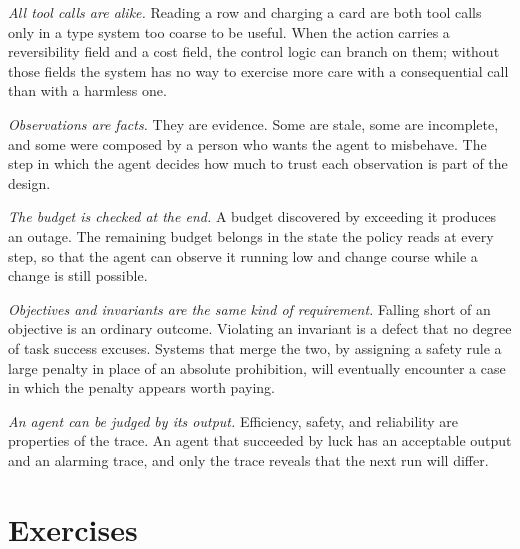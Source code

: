 \documentclass[11pt]{book}
\begin{document}
\textit{All tool calls are alike.} Reading a row and charging a card are both tool calls only in a type system too coarse to be useful. When the action carries a reversibility field and a cost field, the control logic can branch on them; without those fields the system has no way to exercise more care with a consequential call than with a harmless one.

\textit{Observations are facts.} They are evidence. Some are stale, some are incomplete, and some were composed by a person who wants the agent to misbehave. The step in which the agent decides how much to trust each observation is part of the design.

\textit{The budget is checked at the end.} A budget discovered by exceeding it produces an outage. The remaining budget belongs in the state the policy reads at every step, so that the agent can observe it running low and change course while a change is still possible.

\textit{Objectives and invariants are the same kind of requirement.} Falling short of an objective is an ordinary outcome. Violating an invariant is a defect that no degree of task success excuses. Systems that merge the two, by assigning a safety rule a large penalty in place of an absolute prohibition, will eventually encounter a case in which the penalty appears worth paying.

\textit{An agent can be judged by its output.} Efficiency, safety, and reliability are properties of the trace. An agent that succeeded by luck has an acceptable output and an alarming trace, and only the trace reveals that the next run will differ.

\section*{Exercises}
\end{document}
